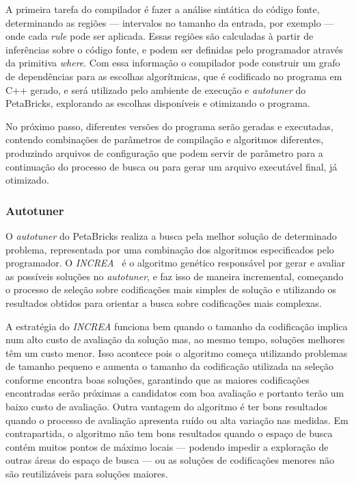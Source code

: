 \documentclass[a4paper, 11pt]{article}
\begin{document}
A primeira tarefa do compilador é fazer a análise sintática do código fonte, 
determinando as regiões --- intervalos no tamanho da entrada, por exemplo ---
onde cada \emph{rule} pode ser aplicada. Essas regiões são calculadas à partir
de inferências sobre o código fonte, e podem ser definidas pelo programador
através da primitiva \emph{where}. Com essa informação o compilador pode 
construir um grafo de dependências para as escolhas algorítmicas,
que é codificado no programa em C++ gerado, e será utilizado pelo ambiente de
execução e \emph{autotuner} do PetaBricks, explorando as escolhas disponíveis
e otimizando o programa.

No próximo passo, diferentes versões do programa serão geradas e executadas, 
contendo combinações de parâmetros de compilação e algoritmos diferentes, 
produzindo arquivos de configuração que podem servir de parâmetro para a 
continuação do processo de busca ou para gerar um arquivo executável final, 
já otimizado.

\subsubsection{Autotuner}\label{sec:autotuner}

O \emph{autotuner} do PetaBricks realiza a busca pela melhor solução de 
determinado problema, representada por uma combinação dos algoritmos 
especificados pelo programador. O \emph{INCREA}~\citet{ansel2011efficient} é o 
algoritmo genético responsável por gerar e avaliar as possíveis soluções 
no \emph{autotuner}, e faz isso de maneira incremental, começando
o processo de seleção sobre codificações mais simples de solução e utilizando 
os resultados obtidos para orientar a busca sobre codificações mais complexas.

A estratégia do \emph{INCREA} funciona bem quando o tamanho da codificação
implica num alto custo de avaliação da solução mas, ao mesmo tempo, soluções
melhores têm um custo menor. Isso acontece pois o algoritmo começa utilizando
problemas de tamanho pequeno e aumenta o tamanho da codificação utilizada na 
seleção conforme encontra boas soluções, garantindo que as maiores codificações
encontradas serão próximas a candidatos com boa avaliação e portanto terão um
baixo custo de avaliação. Outra vantagem do algoritmo é ter bons resultados
quando o processo de avaliação apresenta ruído ou alta variação nas medidas.
Em contrapartida, o algoritmo não tem bons resultados quando o espaço de busca
contém muitos pontos de máximo locais --- podendo impedir a 
exploração de outras áreas do espaço de busca --- ou as soluções de 
codificações menores não são reutilizáveis para soluções maiores.
\end{document}
